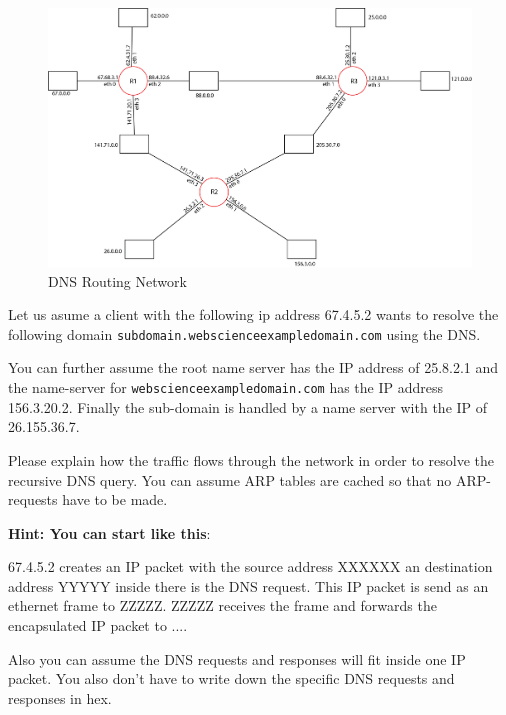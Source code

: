 \documentclass{WeSTassignment}
\begin{document}
\begin{figure}[h]
  \centering
  \includegraphics[scale=0.45]{ass3_DNS.png}
   \caption{DNS Routing Network}
     \label{fig:routing} 
\end{figure}

Let us asume a client with the following ip address 67.4.5.2 wants to resolve the following domain  \texttt{subdomain.webscienceexampledomain.com} using the DNS.

You can further assume the root name server has the IP address of 25.8.2.1 and the name-server for \texttt{webscienceexampledomain.com} has the IP address 156.3.20.2. 
Finally the sub-domain is handled by a name server with the IP of 26.155.36.7. 

Please explain how the traffic flows through the network in order to resolve the recursive DNS query. You can assume ARP tables are cached so that no ARP-requests have to be made. 

\textbf{Hint: You can start like this}: 

67.4.5.2 creates an IP packet with the source address XXXXXX an destination address YYYYY inside there is the DNS request. This IP packet is send as an ethernet frame to ZZZZZ. 
ZZZZZ receives the frame and forwards the encapsulated IP packet to ....

Also you can assume the DNS requests and responses will fit inside one IP packet. You also don't have to write down the specific DNS requests and responses in hex. \\ \\
\end{document}
